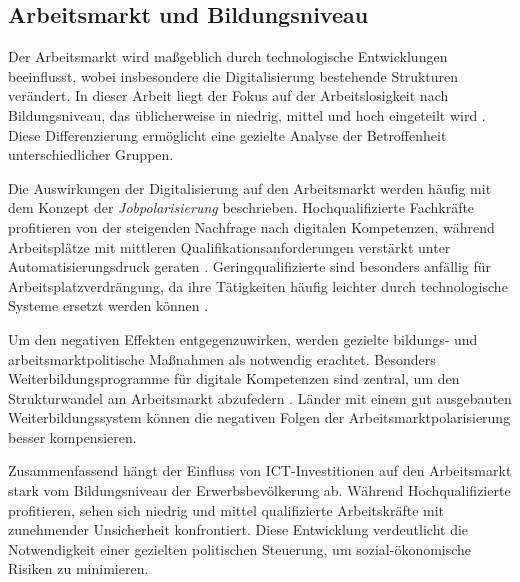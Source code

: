 
\subsection{Arbeitsmarkt und Bildungsniveau}

Der Arbeitsmarkt wird maßgeblich durch technologische Entwicklungen beeinflusst,
wobei insbesondere die Digitalisierung bestehende Strukturen verändert. In dieser
Arbeit liegt der Fokus auf der Arbeitslosigkeit nach Bildungsniveau, das üblicherweise
in niedrig, mittel und hoch eingeteilt wird \parencite[vgl.][S. 35–37]{frey2013thefuture}.
Diese Differenzierung ermöglicht eine gezielte Analyse der Betroffenheit
unterschiedlicher Gruppen.

Die Auswirkungen der Digitalisierung auf den Arbeitsmarkt werden häufig mit dem
Konzept der \textit{Jobpolarisierung} beschrieben. Hochqualifizierte Fachkräfte 
profitieren von der steigenden Nachfrage nach digitalen Kompetenzen, während 
Arbeitsplätze mit mittleren Qualifikationsanforderungen verstärkt unter 
Automatisierungsdruck geraten \parencite[vgl.][S. 40]{autor2015whyare}. 
Geringqualifizierte sind besonders anfällig für Arbeitsplatzverdrängung, da ihre 
Tätigkeiten häufig leichter durch technologische Systeme ersetzt werden können 
\parencite[vgl.][S. 10]{acemoglu2002technical}.

Um den negativen Effekten entgegenzuwirken, werden gezielte bildungs- und
arbeitsmarktpolitische Maßnahmen als notwendig erachtet. Besonders
Weiterbildungsprogramme für digitale Kompetenzen sind zentral, um den
Strukturwandel am Arbeitsmarkt abzufedern 
\parencite[vgl.][S. 75]{brynjolfsson2014thesecond}. Länder mit einem gut ausgebauten 
Weiterbildungssystem können die negativen Folgen der Arbeitsmarktpolarisierung besser 
kompensieren.

Zusammenfassend hängt der Einfluss von \ac{ICT}-Investitionen auf den Arbeitsmarkt
stark vom Bildungsniveau der Erwerbsbevölkerung ab. Während Hochqualifizierte
profitieren, sehen sich niedrig und mittel qualifizierte Arbeitskräfte mit zunehmender
Unsicherheit konfrontiert. Diese Entwicklung verdeutlicht die Notwendigkeit einer
gezielten politischen Steuerung, um sozial-ökonomische Risiken zu minimieren.
